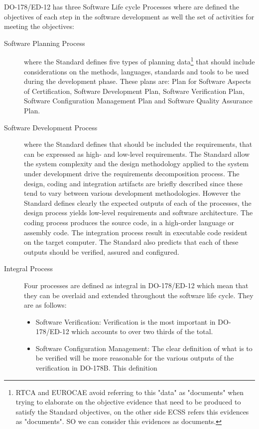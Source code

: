 {DO-178/ED-12 has three Software Life cycle Processes where are defined the objectives of each step in the software development as well
the set of activities for meeting the objectives:
\begin{description}
\item[Software Planning Process] where the Standard defines five types of planning data\footnote{\ac{RTCA} and \ac{EUROCAE} avoid referring to this "data" as
"documents" when trying to elaborate on the objective evidence that need to be produced to satisfy the Standard objectives\cite{avionics}, on the other side \ac{ECSS} refers
this evidences as "documents". SO we can consider this evidences as documents.} that should include
considerations on the methods, languages, standards and tools to be used during the development phase. These plans are: Plan for Software Aspects of Certification,
Software Development Plan, Software Verification Plan, Software Configuration Management Plan and Software Quality Assurance Plan.
\item[Software Development Process] where the Standard defines that should be included the requirements, that can be
expressed as high- and low-level requirements\cite{avionics,citeulike:4106419}. The Standard allow the system complexity and the design methodology applied to the system under development
drive the requirements decomposition process. The design, coding and integration artifacts are briefly described since these tend to vary between various development methodologies.
However the Standard defines clearly the expected outputs of each of the processes, the design process yields low-level requirements and software architecture.
The coding process produces the source code, in a high-order language or assembly code. The integration process result in executable code
resident on the target computer. The Standard also predicts that each of these outputs should be verified, assured and configured.
\item[Integral Process] Four processes are defined as integral in DO-178/ED-12 which
mean that they can be overlaid and extended throughout the
software life cycle. They are as follows:
\begin{itemize}
\item Software Verification: Verification is the most important
in DO-178/ED-12 which accounts to over two thirds of the total.
\item Software Configuration Management: The clear definition
of what is to be verified will be more reasonable for the
various outputs of the verification in DO-178B. This definition

\end{itemize}
\end{description}}
